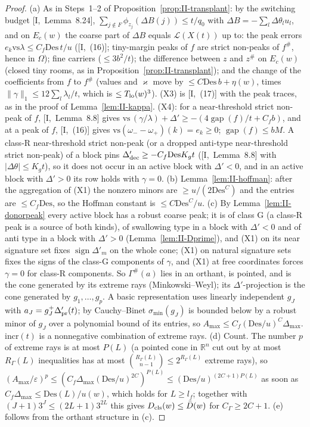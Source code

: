 \documentclass[10pt]{amsart}
\theoremstyle{definition}
\theoremstyle{remark}
\newcommand{\sgn}{\operatorname{sign}}
\newcommand{\R}{\mathbb R}
\newcommand{\gap}{\operatorname{gap}}
\begin{document}
\begin{proof}
(a) As in Steps~1--2 of Proposition~\ref{prop:II-transplant}: by the switching budget
[I,~Lemma~8.24], $\sum_{j\notin F}\phi_{z_j}(\Delta B(j))\le t/q_0$ with $\Delta B=
-\sum_l\Delta\theta_lu_l$, and on $E_c(w)$ the coarse part of $\Delta B$ equals
$\mathcal L(X(t))$ up to: the peak errors $e_k\mathrm{vs}\lambda\le C_f\mathrm{Des}\,t/u$
([I,~(16)]; tiny-margin peaks of $f$ are strict non-peaks of $f^\#$, hence in
$\Omega$); fine carriers ($\le3b^2/t$); the difference between $z$ and $z^\#$ on
$E_c(w)$ (closed tiny rooms, as in Proposition~\ref{prop:II-transplant}); and the change
of the coefficients from $f$ to $f^\#$ (values and $\varkappa$ move by $\le C\mathrm{Des}\,b
+\eta(w)$, times $\|\gamma\|_1\le12\sum_l\lambda_l/t$, which is $\le T_{\rm lo}(w)^3$).  (X3) is
[I,~(17)] with the peak traces, as in the proof of Lemma~\ref{lem:II-kappa}.  (X4):
for a near-threshold strict non-peak of $f$, [I,~Lemma~8.8] gives
$\mathrm{vs}\,(\gamma/\lambda)+\Delta'\ge-(4\gap(f)/t+C_fb)$, and at a peak of $f$,
[I,~(16)] gives $\mathrm{vs}(\omega_--\omega_+)(k)=e_k\ge0$; $\gap(f)\le bM$.  A class-R
near-threshold strict non-peak (or a dropped anti-type near-threshold strict
non-peak) of a block pins $\Delta'_{\rm dec}\ge-C_f\mathrm{Des}K_gt$ ([I,~Lemma~8.8] with
$|\Delta\theta|\le K_gt$), so it does not occur in an active block with $\Delta'<0$, and
in an active block with $\Delta'>0$ its row holds with $\gamma=0$.  (b)
Lemma~\ref{lem:II-hoffman}: after the aggregation of (X1) the nonzero minors are
$\ge u/(2\mathrm{Des}^C)$ and the entries are $\le C_f\mathrm{Des}$, so the Hoffman
constant is $\le C\mathrm{Des}^C/u$.  (c) By Lemma~\ref{lem:II-donorpeak} every active block
has a robust coarse peak; it is of class G (a class-R peak is a source of both
kinds), of swallowing type in a block with $\Delta'<0$ and of anti type in a block
with $\Delta'>0$ (Lemma~\ref{lem:II-Dprime}), and (X1) on its near signature set fixes
$\sgn\Delta'_m$ on the whole cone; (X1) on natural signature sets fixes the signs of
the class-G components of $\gamma$, and (X1) at free coordinates forces $\gamma=0$ for
class-R components.  So $\Gamma^\#(a)$ lies in an orthant, is pointed, and is the
cone generated by its extreme rays (Minkowski--Weyl); its $\Delta'$-projection is
the cone generated by $g_1,\dots,g_p$.  A basic representation uses linearly
independent $g_J$ with $a_J=g_J^+\Delta'_{\rm pr}(t)$; by Cauchy--Binet $\sigma_{\min}(g_J)$
is bounded below by a robust minor of $g_J$ over a polynomial bound of its
entries, so $A_{\max}\le C_f(\mathrm{Des}/u)^C\Delta_{\max}$.  $\mathrm{incr}(t)$ is a nonnegative
combination of extreme rays.  (d) Count.  The number $p$ of extreme rays is
at most $P(L)$ (a pointed cone in $\R^n$ cut out by at most $R_\Gamma(L)$
inequalities has at most $\binom{R_\Gamma(L)}{n-1}\le2^{R_\Gamma(L)}$ extreme
rays), so $(A_{\max}/\varepsilon)^p\le(C_f\Delta_{\max}(\mathrm{Des}/u)^{2C})^{P(L)}
\le(\mathrm{Des}/u)^{(2C+1)P(L)}$ as soon as $C_f\Delta_{\max}\le\mathrm{Des}(L)/
u(w)$, which holds for $L\ge l_f$; together with $(J+1)3^J\le(2L+1)3^{2L}$
this gives $D_{\rm cls}(w)\le\bar D(w)$ for $C_\Gamma\ge2C+1$.  (e) follows from the orthant
structure in (c).
\end{proof}
\end{document}
